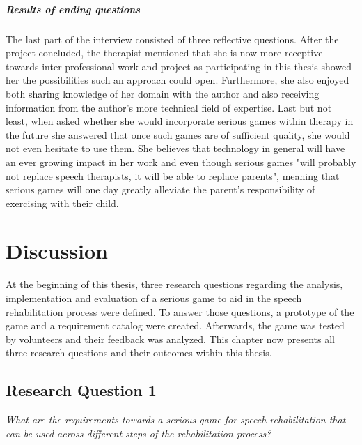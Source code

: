 \documentclass[draft,final]{vutinfth} %
\begin{document}
\paragraph{Results of ending questions}
The last part of the interview consisted of three reflective questions. After the project concluded, the therapist mentioned that she is now more receptive towards inter-professional work and project as participating in this thesis showed her the possibilities such an approach could open. Furthermore, she also enjoyed both sharing knowledge of her domain with the author and also receiving information  from the author's more technical field of expertise. Last but not least, when asked whether she would incorporate serious games within therapy in the future she answered that once such games are of sufficient quality, she would not even hesitate to use them. She believes that technology in general will have an ever growing impact in her work and even though serious games "will probably not replace speech therapists, it will be able to replace parents", meaning that serious games will one day greatly alleviate the parent's responsibility of exercising with their child.

\chapter{Discussion}
\label{chap:discussion}
At the beginning of this thesis, three research questions regarding the analysis, implementation and evaluation of a serious game to aid in the speech rehabilitation process were defined. To answer those questions, a prototype of the game and a requirement catalog were created. Afterwards, the game was tested by volunteers and their feedback was analyzed. This chapter now presents all three research questions and their outcomes within this thesis.

\section{Research Question 1}
\begin{center}
\emph{What are the requirements towards a serious game for speech rehabilitation that can be used across different steps of the rehabilitation process?}
\end{center} 
\end{document}
